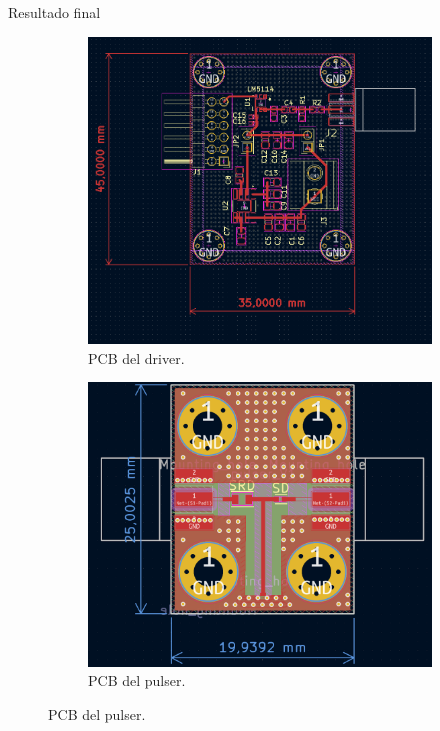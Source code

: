 \documentclass{beamer}
\begin{document}
\begin{frame}{Resultado final}

    \begin{figure}[t!]
        \centering
        \begin{subfigure}[b]{0.45\textwidth}
            \includegraphics[width=\textwidth]{images/driver_pcb.png}
            \caption{PCB del driver.}
        \end{subfigure}
        \hfill
        \begin{subfigure}[b]{0.45\textwidth}
            \includegraphics[width=\textwidth]{images/pulser_layout.png}
            \caption{PCB del pulser.}
        \end{subfigure}
    \end{figure}

\end{frame}
\end{document}
